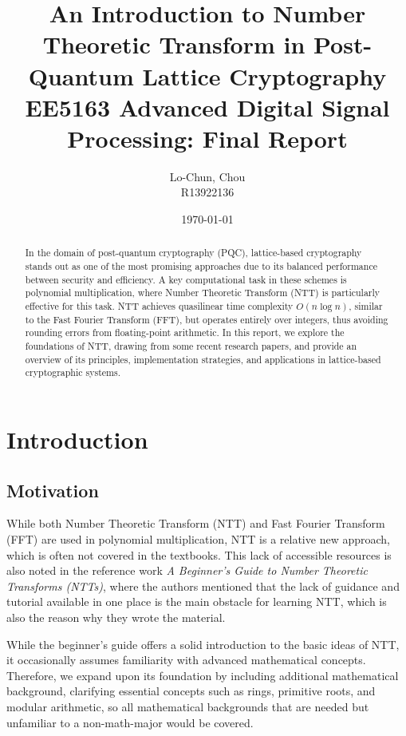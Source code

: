 \documentclass[12pt]{article}
\title{
    An Introduction to Number Theoretic Transform in Post-Quantum Lattice Cryptography \\
    \large EE5163 Advanced Digital Signal Processing: Final Report 
}
\author[1]{
    Lo-Chun, Chou \\
    \small R13922136
}
\affil[1]{Department of Computer Science, National Taiwan University}
\date{\today}
\begin{document}
\maketitle

\begin{abstract}
    In the domain of post-quantum cryptography (PQC), 
    lattice-based cryptography stands out as one of the most promising approaches due to its balanced performance between security and efficiency. 
    A key computational task in these schemes is polynomial multiplication, 
    where Number Theoretic Transform (NTT) is particularly effective for this task. 
    NTT achieves quasilinear time complexity $O(n \log n)$, 
    similar to the Fast Fourier Transform (FFT), 
    but operates entirely over integers, 
    thus avoiding rounding errors from floating-point arithmetic.
    In this report, we explore the foundations of NTT, 
    drawing from some recent research papers, 
    and provide an overview of its principles, implementation strategies, 
    and applications in lattice-based cryptographic systems.
\end{abstract}

\section{Introduction}

\subsection{Motivation}

While both Number Theoretic Transform (NTT) and Fast Fourier Transform (FFT) are used in polynomial multiplication, 
NTT is a relative new approach, which is often not covered in the textbooks. 
This lack of accessible resources is also noted in the reference work 
\emph{A Beginner's Guide to Number Theoretic Transforms (NTTs)}, 
where the authors mentioned that the lack of guidance and tutorial available in one place is the main obstacle for learning NTT\cite{beginner_guide}, 
which is also the reason why they wrote the material.

While the beginner's guide offers a solid introduction to the basic ideas of NTT, 
it occasionally assumes familiarity with advanced mathematical concepts. 
Therefore, we expand upon its foundation by including additional mathematical background, 
clarifying essential concepts such as rings, primitive roots, and modular arithmetic, 
so all mathematical backgrounds that are needed but unfamiliar to a non-math-major would be covered.
\end{document}
